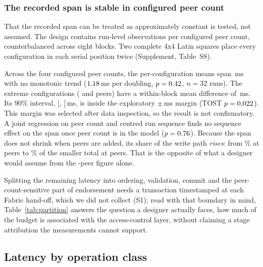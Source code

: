 \documentclass[a4paper,fleqn]{cas-sc}
\begin{document}


\subsubsection{The recorded span is stable in configured peer count}
\label{subsubsec:acinvariance}

That the recorded span can be treated as approximately constant is tested,
not assumed. The design contains \PartRunsPerConfig{} run-level observations
per configured peer count, counterbalanced across eight blocks. Two complete
4x4 Latin squares place every configuration in each serial position twice
(Supplement, Table~S8).

Across the four configured peer counts, the per-configuration means span
\PartSpread\,ms with no monotonic trend ($1.18$\,ms per doubling,
$p=0.42$, $n=32$ runs). The extreme configurations
(\ScaleMinPeers{} and \ScaleMaxPeers{} peers) have a within-block mean
difference of \PartTostDiff\,ms. Its 90\% interval,
[\PartTostLow, \PartTostHigh]\,ms, is inside the exploratory
$\pm$\DecisionMargin\,ms margin (TOST $p=0.022$). This margin was
selected after data inspection, so the result is not confirmatory. A joint
regression on peer count and centred run
sequence finds no sequence effect on the span once peer count is in the
model ($p=0.76$). Because the span does not
shrink when peers are added, its share of the write path \emph{rises}: from
\PartAccessPct\% at \ScaleMinPeers{} peers to \PartAccessPctAtMax\% of the
smaller total at \ScaleMaxPeers{} peers. That is the opposite of what a
designer would assume from the \ScaleMinPeers-peer figure alone.

Splitting the remaining latency into ordering, validation, commit and the
peer-count-sensitive part of endorsement needs a transaction timestamped at
each Fabric hand-off, which we did not collect (S1); read with that
boundary in mind, Table~\ref{tab:partition} answers the question a designer
actually faces, how much of the budget is associated with the
access-control layer, without claiming a stage attribution the
measurements cannot support.

\subsection{Latency by operation class}
\label{subsec:byclass}
\end{document}
